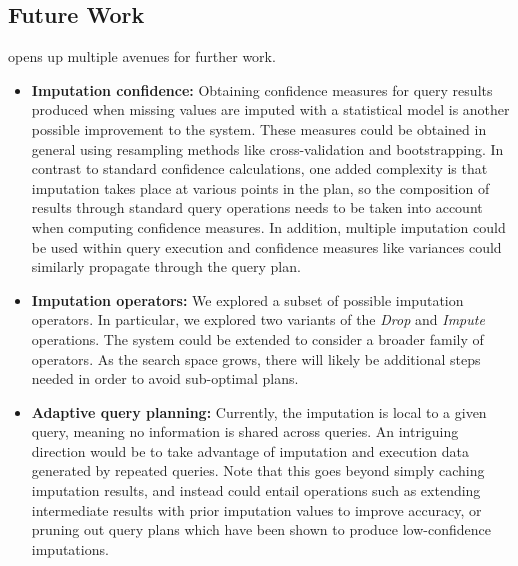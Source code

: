 \subsection{Future Work}
\ProjectName{} opens up multiple avenues for further work.

\begin{itemize}
\item \textbf{Imputation confidence:} Obtaining confidence measures for query results
produced when missing values are imputed with a statistical model is
another possible improvement to the system. These measures could be obtained in general
using resampling methods like cross-validation and bootstrapping\cite{kohavi1995study}.
In contrast to standard confidence calculations, one added complexity is that
imputation takes place at various points in the plan, so the composition of results
through standard query operations needs to be taken into account when computing confidence
measures.
In addition, multiple imputation could be used within query execution and confidence measures like variances could
similarly propagate through the query plan.

\item \textbf{Imputation operators:} We explored a subset of possible imputation operators.
In particular, we explored two variants of the \textit{Drop} and \textit{Impute} operations. The system
could be extended to consider a broader family of operators. As the search space grows,
there will likely be additional steps needed in order to avoid sub-optimal plans.

\item \textbf{Adaptive query planning:} Currently, the imputation is local to a given query, meaning
no information is shared across queries. An intriguing direction would be to take advantage
of imputation and execution data generated by repeated queries. Note that this goes beyond
simply caching imputation results, and instead could entail operations such as extending
intermediate results with prior imputation values to improve accuracy, or pruning out
query plans which have been shown to produce low-confidence imputations.
\end{itemize}

